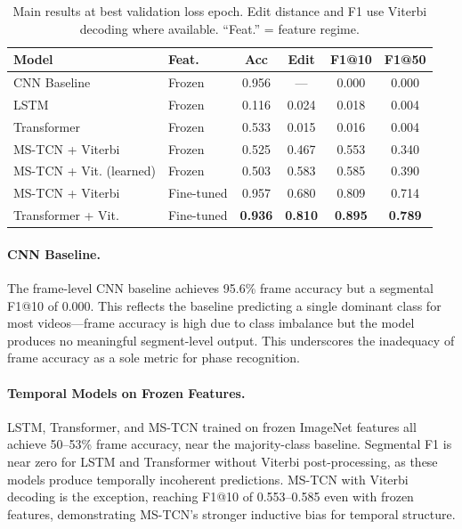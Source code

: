 \documentclass[10pt,twocolumn]{article}
\begin{document}
\begin{table}[h]
\centering
\small
\setlength{\tabcolsep}{4pt}
\begin{tabular}{llcccc}
\toprule
Model & Feat. & Acc & Edit & F1@10 & F1@50 \\
\midrule
CNN Baseline     & Frozen & 0.956 & ---   & 0.000 & 0.000 \\
LSTM             & Frozen & 0.116 & 0.024 & 0.018 & 0.004 \\
Transformer      & Frozen & 0.533 & 0.015 & 0.016 & 0.004 \\
MS-TCN + Viterbi & Frozen & 0.525 & 0.467 & 0.553 & 0.340 \\
MS-TCN + Vit. (learned) & Frozen & 0.503 & 0.583 & 0.585 & 0.390 \\
\midrule
MS-TCN + Viterbi & Fine-tuned & 0.957 & 0.680 & 0.809 & 0.714 \\
Transformer + Vit. & Fine-tuned & \textbf{0.936} & \textbf{0.810} & \textbf{0.895} & \textbf{0.789} \\
\bottomrule
\end{tabular}
\caption{Main results at best validation loss epoch. Edit distance and F1 use Viterbi decoding where available. ``Feat.'' = feature regime.}
\label{tab:main_results}
\end{table}

\paragraph{CNN Baseline.} The frame-level CNN baseline achieves 95.6\% frame accuracy but a segmental F1@10 of 0.000. This reflects the baseline predicting a single dominant class for most videos—frame accuracy is high due to class imbalance but the model produces no meaningful segment-level output. This underscores the inadequacy of frame accuracy as a sole metric for phase recognition.

\paragraph{Temporal Models on Frozen Features.} LSTM, Transformer, and MS-TCN trained on frozen ImageNet features all achieve 50--53\% frame accuracy, near the majority-class baseline. Segmental F1 is near zero for LSTM and Transformer without Viterbi post-processing, as these models produce temporally incoherent predictions. MS-TCN with Viterbi decoding is the exception, reaching F1@10 of 0.553--0.585 even with frozen features, demonstrating MS-TCN's stronger inductive bias for temporal structure.
\end{document}
